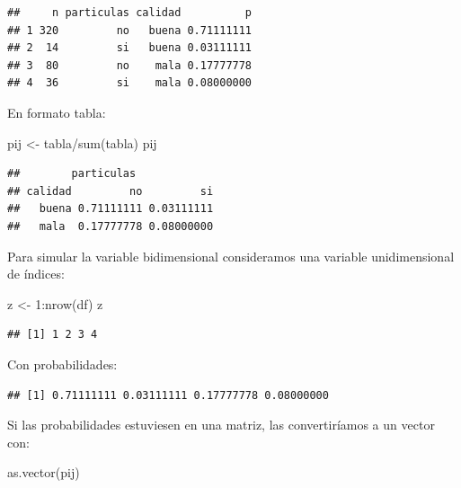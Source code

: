 \documentclass[
]{book}
\newenvironment{Shaded}{\begin{snugshade}}{\end{snugshade}}
\newcommand{\DecValTok}[1]{\textcolor[rgb]{0.00,0.00,0.81}{#1}}
\newcommand{\FunctionTok}[1]{\textcolor[rgb]{0.00,0.00,0.00}{#1}}
\newcommand{\NormalTok}[1]{#1}
\newcommand{\OtherTok}[1]{\textcolor[rgb]{0.56,0.35,0.01}{#1}}
\newcommand{\SpecialCharTok}[1]{\textcolor[rgb]{0.00,0.00,0.00}{#1}}
\theoremstyle{break}
\theoremstyle{nonumberplain}
\begin{document}
\begin{verbatim}
##     n particulas calidad          p
## 1 320         no   buena 0.71111111
## 2  14         si   buena 0.03111111
## 3  80         no    mala 0.17777778
## 4  36         si    mala 0.08000000
\end{verbatim}

En formato tabla:

\begin{Shaded}
\begin{Highlighting}[]
\NormalTok{pij }\OtherTok{\textless{}{-}}\NormalTok{ tabla}\SpecialCharTok{/}\FunctionTok{sum}\NormalTok{(tabla)}
\NormalTok{pij}
\end{Highlighting}
\end{Shaded}

\begin{verbatim}
##        particulas
## calidad         no         si
##   buena 0.71111111 0.03111111
##   mala  0.17777778 0.08000000
\end{verbatim}

Para simular la variable bidimensional consideramos una variable unidimensional de índices:

\begin{Shaded}
\begin{Highlighting}[]
\NormalTok{z }\OtherTok{\textless{}{-}} \DecValTok{1}\SpecialCharTok{:}\FunctionTok{nrow}\NormalTok{(df)}
\NormalTok{z}
\end{Highlighting}
\end{Shaded}

\begin{verbatim}
## [1] 1 2 3 4
\end{verbatim}

Con probabilidades:

\begin{Shaded}
\end{Shaded}

\begin{verbatim}
## [1] 0.71111111 0.03111111 0.17777778 0.08000000
\end{verbatim}

Si las probabilidades estuviesen en una matriz, las convertiríamos a un vector con:

\begin{Shaded}
\begin{Highlighting}[]
\FunctionTok{as.vector}\NormalTok{(pij)}
\end{Highlighting}
\end{Shaded}
\end{document}
